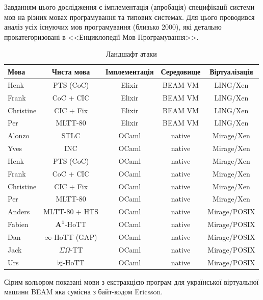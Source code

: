 Завданням цього дослідження є імплементація (апробація)
специфікації системи мов на різних мовах програмування та типових системах.
Для цього проводився аналіз усіх існуючих мов
програмування (близько 2000), які детально прокатегоризовані
в <<Енциклопедії Мов Програмування>>.

\begin{table}[ht]
 \caption{Ландшафт атаки}
  \begin{tabular}{lcccc}
   \hline
       \textbf{Мова} & \textbf{Чиста мова} & \textbf{Імплементація} & \textbf{Середовище} & \textbf{Віртуалізація} \\
   \hline
 Henk              & PTS (CoC)  & Elixir  & BEAM VM  & LING/Xen   \\
 Frank             & CoC + CIC  & Elixir  & BEAM VM  & LING/Xen   \\
 Christine         & CIC + Fix  & Elixir  & BEAM VM  & LING/Xen   \\
 Per               & MLTT-80    & Elixir  & BEAM VM  & LING/Xen   \\
   \hline
 Alonzo            & STLC       & OCaml   & native   & Mirage/Xen \\
 Yves              & INC        & OCaml   & native   & Mirage/Xen \\
   \hline
 Henk              & PTS (CoC)  & OCaml   & native   & Mirage/Xen \\
 Frank             & CoC + CIC  & OCaml   & native   & Mirage/Xen \\
 Christine         & CIC + Fix  & OCaml   & native   & Mirage/Xen \\
 Per               & MLTT-80    & OCaml   & native   & Mirage/Xen \\
   \hline
 Anders  & MLTT-80 + HTS        & OCaml   & native   & Mirage/POSIX \\
 Fabien  & $\mathbf{A^1}$-HoTT  & OCaml   & native   & Mirage/POSIX \\
 Dan     & $\infty$-HoTT (GAP)  & OCaml   & native   & Mirage/POSIX \\
 Jack    & $\Sigma\Omega$-TT    & OCaml   & native   & Mirage/POSIX \\
 Urs     & $\flat\sharp$-HoTT   & OCaml   & native   & Mirage/POSIX \\
   \hline
  \end{tabular}
  \small Сірим кольором показані мови з екстракцією програм для української віртуальної машини BEAM яка сумісна з байт-кодом Ericsson.
\end{table}

